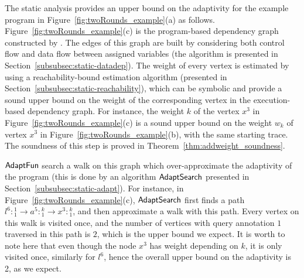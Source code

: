The static analysis provides an upper bound on the adaptivity for the example program in Figure~\ref{fig:twoRounds_example}(a) as follows.
Figure~\ref{fig:twoRounds_example}(c) is the program-based dependency graph constructed by
{\THESYSTEM}.
The edges of this graph are built by considering both control flow and data flow between assigned variables (the algorithm is presented in Section~\ref{subsubsec:static-datadep}). 
The weight of every vertex is estimated by using a reachability-bound estimation algorithm 
(presented in Section~\ref{subsubsec:static-reachability}), which can be symbolic and provide a sound upper bound on the weight of the corresponding vertex in the execution-based dependency graph. 
For instance, the weight $k$ of the vertex $x^{3}$ in Figure~\ref{fig:twoRounds_example}(c) is a sound upper bound on the weight $w_k$ of vertex $x^{3}$ in Figure~\ref{fig:twoRounds_example}(b), with the same starting trace. 
The soundness of this step is proved in Theorem~\ref{thm:addweight_soundness}.

$\textsf{AdaptFun}$ search a walk on this graph which over-approximate the adaptivity of the program (this is done by an algorithm
$\mathsf{AdaptSearch}$ presented in  Section~\ref{subsubsec:static-adapt}). 
For instance, in Figure~\ref{fig:twoRounds_example}(c), $\mathsf{AdaptSearch}$ first finds a path $l^6:{}^1_1 \to a^5: {}^k_1 \to x^3: {}^k_1$, and then approximate a walk with this path.
Every vertex on this walk is visited once, and the number of vertices with query annotation $1$ traversed in this path is $2$, which is the upper bound we expect.
It is worth to note here that even though the node $x^3$ has weight depending on $k$, 
it is only visited once, similarly for $l^6$, hence the overall upper bound on the adaptivity is 2, as we expect.